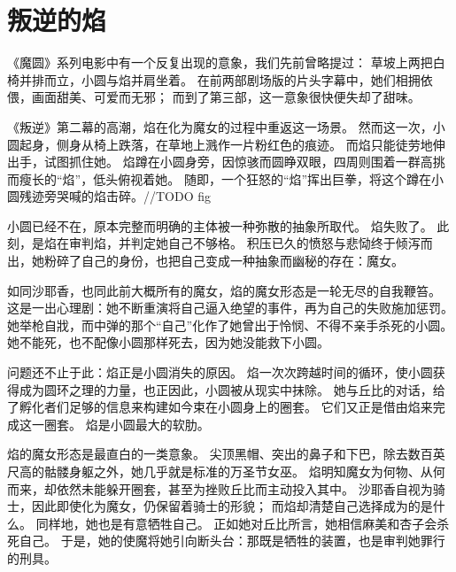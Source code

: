 \chapter{叛逆的焰}
《魔圆》系列电影中有一个反复出现的意象，我们先前曾略提过：
草坡上两把白椅并排而立，小圆与焰并肩坐着。
在前两部剧场版的片头字幕中，她们相拥依偎，画面甜美、可爱而无邪；
而到了第三部，这一意象很快便失却了甜味。

《叛逆》第二幕的高潮，焰在化为魔女的过程中重返这一场景。
然而这一次，小圆起身，侧身从椅上跌落，在草地上溅作一片粉红色的痕迹。
而焰只能徒劳地伸出手，试图抓住她。
焰蹲在小圆身旁，因惊骇而圆睁双眼，四周则围着一群高挑而瘦长的“焰”，低头俯视着她。
随即，一个狂怒的“焰”挥出巨拳，将这个蹲在小圆残迹旁哭喊的焰击碎。//TODO fig

小圆已经不在，原本完整而明确的主体被一种弥散的抽象所取代。
焰失败了。
此刻，是焰在审判焰，并判定她自己不够格。
积压已久的愤怒与悲恸终于倾泻而出，她粉碎了自己的身份，也把自己变成一种抽象而幽秘的存在：魔女。

如同沙耶香，也同此前大概所有的魔女，焰的魔女形态是一轮无尽的自我鞭笞。
这是一出心理剧：她不断重演将自己逼入绝望的事件，再为自己的失败施加惩罚。
她举枪自戕，而中弹的那个“自己”化作了她曾出于怜悯、不得不亲手杀死的小圆。
她不能死，也不配像小圆那样死去，因为她没能救下小圆。

问题还不止于此：焰正是小圆消失的原因。
焰一次次跨越时间的循环，使小圆获得成为圆环之理的力量，也正因此，小圆被从现实中抹除。
她与丘比的对话，给了孵化者们足够的信息来构建如今束在小圆身上的圈套。
它们又正是借由焰来完成这一圈套。
焰是小圆最大的软肋。

焰的魔女形态是最直白的一类意象。
尖顶黑帽、突出的鼻子和下巴，除去数百英尺高的骷髅身躯之外，她几乎就是标准的万圣节女巫。
焰明知魔女为何物、从何而来，却依然未能躲开圈套，甚至为挫败丘比而主动投入其中。
沙耶香自视为骑士，因此即使化为魔女，仍保留着骑士的形貌；
而焰却清楚自己选择成为的是什么。
同样地，她也是有意牺牲自己。
正如她对丘比所言，她相信麻美和杏子会杀死自己。
于是，她的使魔将她引向断头台：那既是牺牲的装置，也是审判她罪行的刑具。

